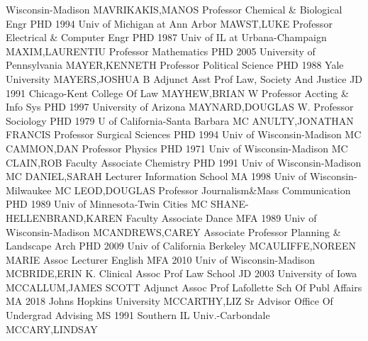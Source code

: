 \documentclass[
]{article}
\begin{document}
Wisconsin-Madison \textbar MAVRIKAKIS,MANOS \textbar{} 
\textbar Professor \textbar Chemical \& Biological Engr \textbar PHD
1994 Univ of Michigan at Ann Arbor \textbar MAWST,LUKE \textbar{}
 \textbar Professor \textbar Electrical \& Computer Engr
\textbar PHD 1987 Univ of IL at Urbana-Champaign
\textbar MAXIM,LAURENTIU \textbar{}  \textbar Professor
\textbar Mathematics \textbar PHD 2005 University of Pennsylvania
\textbar MAYER,KENNETH \textbar{}  \textbar Professor
\textbar Political Science \textbar PHD 1988 Yale University
\textbar MAYERS,JOSHUA B \textbar{}  \textbar Adjunct Asst
Prof \textbar Law, Society And Justice \textbar JD 1991 Chicago-Kent
College Of Law \textbar MAYHEW,BRIAN W \textbar{} 
\textbar Professor \textbar Accting \& Info Sys \textbar PHD 1997
University of Arizona \textbar MAYNARD,DOUGLAS W. \textbar{}
 \textbar Professor \textbar Sociology \textbar PHD 1979 U
of California-Santa Barbara \textbar MC ANULTY,JONATHAN FRANCIS
\textbar{}  \textbar Professor \textbar Surgical Sciences
\textbar PHD 1994 Univ of Wisconsin-Madison \textbar MC CAMMON,DAN
\textbar{}  \textbar Professor \textbar Physics \textbar PHD
1971 Univ of Wisconsin-Madison \textbar MC CLAIN,ROB \textbar{}
 \textbar Faculty Associate \textbar Chemistry \textbar PHD
1991 Univ of Wisconsin-Madison \textbar MC DANIEL,SARAH \textbar{}
 \textbar Lecturer \textbar Information School \textbar MA
1998 Univ of Wisconsin-Milwaukee \textbar MC LEOD,DOUGLAS \textbar{}
 \textbar Professor \textbar Journalism\&Mass Communication
\textbar PHD 1989 Univ of Minnesota-Twin Cities \textbar MC
SHANE-HELLENBRAND,KAREN \textbar{}  \textbar Faculty
Associate \textbar Dance \textbar MFA 1989 Univ of Wisconsin-Madison
\textbar MCANDREWS,CAREY \textbar{}  \textbar Associate
Professor \textbar Planning \& Landscape Arch \textbar PHD 2009 Univ of
California Berkeley \textbar MCAULIFFE,NOREEN MARIE \textbar{}
 \textbar Assoc Lecturer \textbar English \textbar MFA 2010
Univ of Wisconsin-Madison \textbar MCBRIDE,ERIN K. \textbar{}
 \textbar Clinical Assoc Prof \textbar Law School
\textbar JD 2003 University of Iowa \textbar MCCALLUM,JAMES SCOTT
\textbar{}  \textbar Adjunct Assoc Prof \textbar Lafollette
Sch Of Publ Affairs \textbar MA 2018 Johns Hopkins University
\textbar MCCARTHY,LIZ \textbar{}  \textbar Sr Advisor
\textbar Office Of Undergrad Advising \textbar MS 1991 Southern IL
Univ.-Carbondale \textbar MCCARY,LINDSAY \textbar{} 
\end{document}
